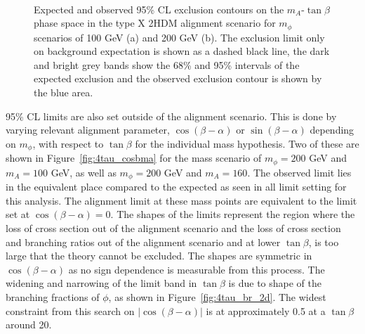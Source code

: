 \begin{figure}[!hbtp]
\centering
     \\
\caption{Expected and observed 95\% CL exclusion contours on the $m_{A}$-$\tan\beta$ phase space in the type X 2HDM alignment scenario for $m_{\phi}$ scenarios of 100 GeV (a) and 200 GeV (b). The exclusion limit only on background expectation is shown as a dashed black line, the dark and bright grey bands show the 68\% and 95\% intervals of the expected exclusion and the observed exclusion contour is shown by the blue area.}
\label{fig:4tau_md}
\end{figure}

95\% \ac{CL} limits are also set outside of the alignment scenario.
This is done by varying relevant alignment parameter, $\cos(\beta-\alpha)$ or $\sin(\beta-\alpha)$ depending on $m_\phi$, with respect to $\tan\beta$ for the individual mass hypothesis.
Two of these are shown in Figure~\ref{fig:4tau_cosbma} for the mass scenario of $m_{\phi} = 200$ GeV and $m_{A} = 100$ GeV, as well as $m_{\phi} = 200$ GeV and $m_{A} = 160$.
The observed limit lies in the equivalent place compared to the expected as seen in all limit setting for this analysis.
The alignment limit at these mass points are equivalent to the limit set at $\cos(\beta-\alpha) = 0$.
The shapes of the limits represent the region where the loss of cross section out of the alignment scenario and the loss of cross section and branching ratios out of the alignment scenario and at lower $\tan\beta$, is too large that the theory cannot be excluded.
The shapes are symmetric in $\cos(\beta-\alpha)$ as no sign dependence is measurable from this process.
The widening and narrowing of the limit band in $\tan\beta$ is due to shape of the branching fractions of $\phi$, as shown in Figure~\ref{fig:4tau_br_2d}.
The widest constraint from this search on $|\cos(\beta-\alpha)|$ is at approximately 0.5 at a $\tan\beta$ around 20.

